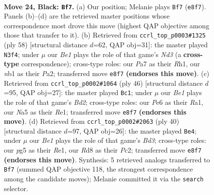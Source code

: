 \documentclass[11pt]{article}
\begin{document}
\clearpage

\begin{figure}[p]\centering
\begin{subfigure}{0.46\textwidth}\centering
\resizebox{\linewidth}{!}{%
\newchessgame
\chessboard[
  setfen={3rbbn1/p1k3r1/1p2p1p1/nP1pP1Pp/P2P1P2/6K1/3N4/RNB2B1R b - - 3 24},
  showmover=false,
  pgfstyle=straightmove, color=movearrow, markmove={e8-f7}
]}
\caption{}
\end{subfigure}\hfill
\begin{subfigure}{0.46\textwidth}\centering
\resizebox{\linewidth}{!}{%
\newchessgame
\chessboard[
  setfen={1r2nr2/3b1pbk/2np2p1/p1pN2Pp/4P2P/1P1NBP2/P2RB3/2K4R w - - 2 30},
  showmover=false,
  pgfstyle=straightmove, color=movearrow, markmove={d3-f4}
]}
\caption{}
\end{subfigure}
\\[4pt]
\begin{subfigure}{0.46\textwidth}\centering
\resizebox{\linewidth}{!}{%
\newchessgame
\chessboard[
  setfen={r1n1br2/1pk1b2p/2p5/p4pp1/P1NP1p2/1PP2B2/3B2PP/R3R1K1 w - - 0 24},
  showmover=false,
  pgfstyle=straightmove, color=movearrow, markmove={d2-c1}
]}
\caption{}
\end{subfigure}\hfill
\begin{subfigure}{0.46\textwidth}\centering
\resizebox{\linewidth}{!}{%
\newchessgame
\chessboard[
  setfen={b3k2r/2rp1pp1/p3p3/N2nP2p/Pp3P2/3B4/1PP3PP/1K1RR3 w k - 3 21},
  showmover=false,
  pgfstyle=straightmove, color=movearrow, markmove={d3-e4}
]}
\caption{}
\end{subfigure}
\caption{\textbf{Move 24, Black: \texttt{Bf7}.} (a) Our position; Melanie plays \texttt{Bf7} (\texttt{e8f7}). Panels (b)--(d) are the retrieved master positions whose correspondence most drove this move (highest QAP objective among those that transfer to it). (b) Retrieved from \texttt{ccrl\_top\_p0003\#1325} (ply 58) [structural distance $d$=62, QAP obj=31]: the master played \texttt{N3f4}; under $\mu$ our \emph{Be1} plays the role of that game's \emph{Nd3} (a \textbf{cross-type} correspondence); cross-type roles: our \emph{P}a7 as their \emph{R}h1, our \emph{n}b1 as their \emph{P}a2; transferred move \texttt{e8f7} \textbf{(endorses this move)}. (c) Retrieved from \texttt{ccrl\_top\_p0002\#1064} (ply 46) [structural distance $d$=95, QAP obj=27]: the master played \texttt{Bc1}; under $\mu$ our \emph{Be1} plays the role of that game's \emph{Bd2}; cross-type roles: our \emph{P}e6 as their \emph{R}a1, our \emph{N}a5 as their \emph{R}e1; transferred move \texttt{e8f7} \textbf{(endorses this move)}. (d) Retrieved from \texttt{ccrl\_top\_p0002\#2063} (ply 40) [structural distance $d$=97, QAP obj=26]: the master played \texttt{Be4}; under $\mu$ our \emph{Be1} plays the role of that game's \emph{Bd3}; cross-type roles: our \emph{p}g5 as their \emph{R}e1, our \emph{R}d8 as their \emph{P}c2; transferred move \texttt{e8f7} \textbf{(endorses this move)}. Synthesis: 5 retrieved analogs transferred to \texttt{Bf7} (summed QAP objective 118, the strongest correspondence among the candidate moves); Melanie committed it via the \texttt{search} selector.}
\label{fig:thought-m47}
\end{figure}
\end{document}
